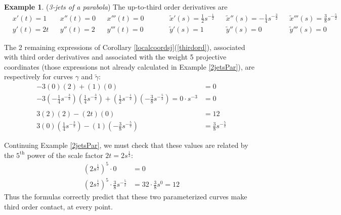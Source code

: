 \documentclass[12pt]{article}
\numberwithin{equation}{section}
\theoremstyle{plain}
\theoremstyle{definition}
\newtheorem{example}[definition]{Example}
\begin{document}
\begin{example} (\emph{3-jets of a parabola})
The up-to-third order derivatives are
\begin{align*}
&x'(t)=1&  &x''(t)=0& &x'''(t)=0\qquad&  &\tilde{x}'(s)=\tfrac{1}{2}s^{-\tfrac{1}{2}}& &\tilde{x}''(s)=-\tfrac{1}{4}s^{-\tfrac{3}{2}}& &\tilde{x}'''(s)=\tfrac{3}{8}s^{-\tfrac{5}{2}}&\\
&y'(t)=2t& &y''(t)=2& &y'''(t)=0\qquad& &\tilde{y}'(s)=1& &\tilde{y}''(s)=0& &\tilde{y}'''(s)=0&
\end{align*}

The 2 remaining expressions of Corollary \ref{localcoordsj}(\ref{thirdord}), associated with third order derivatives and associated with the weight 5 projective coordinates (those expressions not already calculated in Example \ref{2jetsPar}), are respectively for curves $\gamma$ and $\tilde{\gamma}$:
\begin{align*}
-3(0)(2) + (1)(0) &= 0\\
-3\left( -\tfrac{1}{4}s^{-\tfrac{3}{2}} \right)\left(\tfrac{1}{4}s^{-\tfrac{3}{2}} \right) + \left(  \tfrac{1}{2}s^{-\tfrac{1}{2}} \right)\left(-\tfrac{3}{8}s^{-\tfrac{5}{2}} \right)=0\cdot s^{-3}&=0\\
\quad&\\
3(2)(2) - (2t)(0) &= 12\\
3\left(  0  \right)\left(\tfrac{1}{4}s^{-\tfrac{3}{2}} \right) - \left(  1  \right)\left(-\tfrac{3}{8}s^{-\tfrac{5}{2}} \right)&= \tfrac{3}{8}s^{-\tfrac{5}{2}}
\end{align*}

Continuing Example \ref{2jetsPar}, we must check that these values are related by the $5^{\text{th}}$ power of the scale factor $2t = 2s^{\tfrac{1}{2}}$:
\begin{align*}
(2s^{\tfrac{1}{2}})^{5}\cdot 0&=0\\
(2s^{\tfrac{1}{2}})^{5}\cdot \tfrac{3}{8}s^{-\tfrac{5}{2}} &= 32\cdot \tfrac{3}{8} s^{0} = 12
\end{align*}
Thus the formulas correctly predict that these two parameterized curves make third order contact, at every point. 
\end{example}
\end{document}
